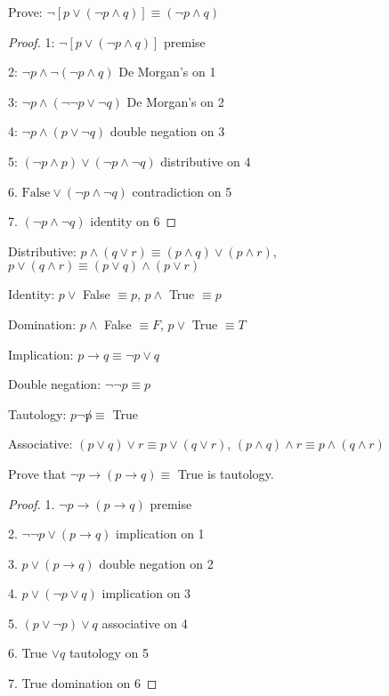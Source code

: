 \begin{prob}

Prove: $\lnot [p \lor (\lnot p \land q)] \equiv (\lnot p \land q)$

\end{prob}

\begin{proof}

1: $\lnot [p \lor (\lnot p \land q)]$ premise

2: $\lnot p \land \lnot (\lnot p \land q)$ De Morgan's on 1

3: $\lnot p \land (\lnot \lnot p \lor \lnot q)$ De Morgan's on 2

4: $\lnot p \land (p \lor \lnot q)$ double negation on 3

5: $(\lnot p \land p) \lor (\lnot p \land \lnot q)$ distributive on 4

6. $\text{False} \lor (\lnot p \land \lnot q)$ contradiction on 5

7. $(\lnot p \land \lnot q)$ identity on 6

\end{proof}

Distributive: $p \land (q \lor r) \equiv (p \land q) \lor (p \land r)$, $p \lor (q \land r) \equiv (p \lor q) \land (p \lor r)$

Identity: $p \lor$ False $\equiv p$, $p \land$ True $\equiv p$

Domination: $p \land$ False $\equiv F$, $p \lor$ True $\equiv T$

Implication: $p \rightarrow q \equiv \lnot p \lor q$

Double negation: $\lnot \lnot p \equiv p$

Tautology: $p \lnot \not p \equiv$ True

Associative: $(p \lor q) \lor r \equiv p \lor (q \lor r)$, $(p \land q) \land r \equiv p \land (q \land r)$

\begin{prob}

Prove that $\lnot p \rightarrow (p \rightarrow q) \equiv$ True is tautology.

\end{prob}

\begin{proof}

1. $\lnot p \rightarrow (p \rightarrow q)$ premise

2. $\lnot \lnot p \lor (p \rightarrow q)$ implication on 1

3. $p \lor (p \rightarrow q)$ double negation on 2

4. $p \lor (\lnot p \lor q)$ implication on 3

5. $(p \lor \lnot p) \lor q$ associative on 4

6. True $\lor q$ tautology on 5

7. True domination on 6

\end{proof}

